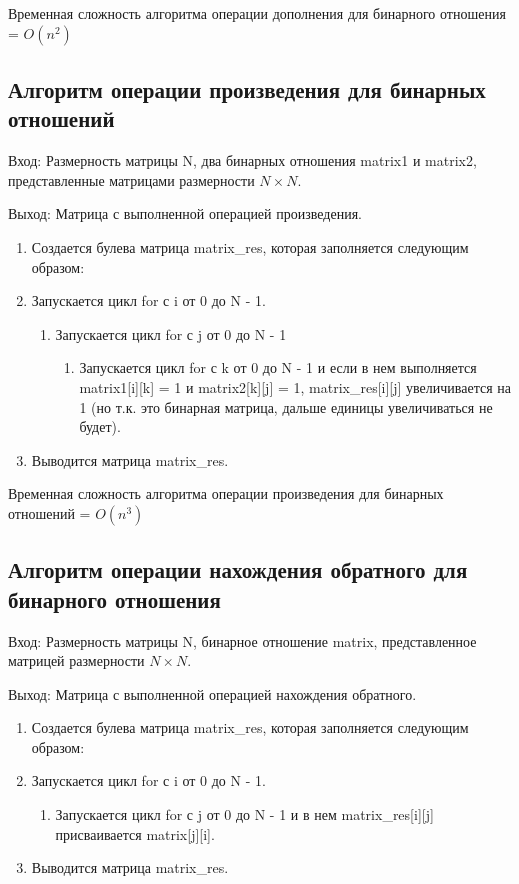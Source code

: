 \documentclass[bachelor, och, labwork]{shiza}
\begin{document}
	Временная сложность алгоритма операции дополнения для бинарного отношения = $O(n^2)$

	\subsection{Алгоритм операции произведения для бинарных отношений}
	
		$\textit{Вход:}$ Размерность матрицы N, два бинарных отношения matrix1 и matrix2, представленные матрицами размерности $N \times N$.
	
		$\textit{Выход:}$  Матрица с выполненной операцией произведения.	
			
	\begin{enumerate} 
		\item Создается булева матрица matrix\_res, которая заполняется следующим образом:
		\item Запускается цикл for с i от 0 до N - 1.
		\begin{enumerate} 
			\item Запускается цикл for с j от 0 до N - 1
			\begin{enumerate} 
			 \item Запускается цикл for с k от 0 до N - 1 и если в нем выполняется matrix1[i][k] = 1 и
			matrix2[k][j] = 1, matrix\_res[i][j] увеличивается на 1 (но т.к. это бинарная матрица, дальше единицы увеличиваться не будет).
			\end{enumerate}
		\end{enumerate}
		\item Выводится матрица matrix\_res.
	\end{enumerate} 
	
	Временная сложность алгоритма операции произведения для бинарных отношений = $O(n^3)$	
	
	\subsection{Алгоритм операции нахождения обратного для бинарного отношения}
	
			$\textit{Вход:}$ Размерность матрицы N, бинарное отношение matrix, представленное матрицей размерности $N \times N$.

			$\textit{Выход:}$  Матрица с выполненной операцией нахождения обратного.	

	\begin{enumerate} 
		\item Создается булева матрица matrix\_res, которая заполняется следующим образом:
		\item Запускается цикл for с i от 0 до N - 1.
		\begin{enumerate} 
			\item Запускается цикл for с j от 0 до N - 1 и в нем   matrix\_res[i][j] присваивается matrix[j][i].
		\end{enumerate}
		\item Выводится матрица matrix\_res.
	\end{enumerate} 
	
\end{document}
